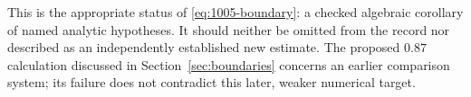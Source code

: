 This is the appropriate status of \eqref{eq:1005-boundary}: a checked algebraic corollary of named analytic hypotheses. It should neither be omitted from the record nor described as an independently established new estimate. The proposed $0.87$ calculation discussed in Section~\ref{sec:boundaries} concerns an earlier comparison system; its failure does not contradict this later, weaker numerical target.
